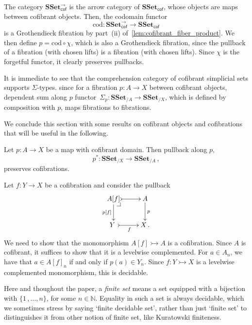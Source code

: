 \documentclass[reqno,10pt,a4paper,oneside,draft]{amsart}
\makeatletter
\renewenvironment{proof}[1][\proofname] {\par\pushQED{\qed}\normalfont\topsep6\p@\@plus6\p@\relax\trivlist\item[\hskip\labelsep\bf#1\@addpunct{.}]\ignorespaces}{\popQED\endtrivlist\@endpefalse}
\numberwithin{equation}{section}
\theoremstyle{mythm}
\theoremstyle{mydef}
\theoremstyle{myrmk}
\newcommand{\pullback}[1]{\save*!/#1-1.2pc/#1:(-1,1)@^{|-}\restore}
\newcommand{\drpullback}{\pullback{dr}}
\newcommand{\co}{\colon}
\newcommand{\SSet}{\mathbf{SSet}}
\makeatother
\begin{document}
\begin{proof} The category $\SSet^\to_{\mathsf{cof}}$ is the arrow category of $\SSet_{\mathsf{cof}}$, whose objects are
maps  between cofibrant objects. Then, the codomain
functor 
\[
\mathrm{cod} \co \SSet^{\to}_{\mathsf{cof}} \to \SSet_{\mathsf{cof}}
\] 
is a Grothendieck fibration by part~(ii) of~\cref{lem:cofibrant_fiber_product}. We then define $p = \mathrm{cod} \circ \chi$, which
 is also a Grothendieck fibration, since the pullback of a fibration (with chosen lifts) is a fibration (with chosen lifts).
  Since $\chi$ is the forgetful functor, it clearly preserves pullbacks.
\end{proof}



\begin{remark} \label{thm:sigma-types} It is immediate to see that the comprehension category of cofibrant simplicial sets supports $\Sigma$-types. since for a fibration $p \co A \to X$ between cofibrant objects, dependent sum along $p$  functor~$\Sigma_p \co \SSet_{/A} \to \SSet_{/X}$, which is defined by
composition with $p$, maps fibrations to fibrations.
\end{remark}

\medskip


We conclude this section with some  results on cofibrant objects and cofibrations
that will be useful in the following. 


\begin{proposition} \label{thm:cof-pbk}  Let $p \co A \to X$  be a map with cofibrant domain.
Then pullback along $p$, \[
p^* \co \SSet_{/X} \to \SSet_{/A} \, , 
\]
preserves cofibrations. 
\end{proposition}

\begin{proof} Let $f \co Y \to X$ be a cofibration and consider the pullback
\[
\xymatrix{
A[f]  \ar@{>->}[r] \drpullback \ar[d]_-{p[f]} &  A \ar[d]^{p} \\
Y \ar@{>->}[r]_{f} \ & X \, .}
\]
We need to show that the monomorphism $A[f] \rightarrowtail A$ is a cofibration. 
Since $A$ is cofibrant, it suffices to show that it is a levelwise complemented. For $a \in A_n$, we have that $a \in A[f]_n$ if and only if $p(a) \in Y_n$. Since $f \co Y \rightarrowtail X$ is a levelwise complemented monomorphism, this is decidable.
\end{proof} 

Here and thoughout the paper, a {\em finite set} means a set equipped with a bijection with $\{1 \, , \ldots,  n \}$, for some $n \in \mathbb{N}$. Equality in such a set
is always decidable, which we sometimes stress by saying `finite decidable set', rather than just `finite set' to distinguishes it from other notion of finite set, like Kuratowski finiteness.
\end{document}
